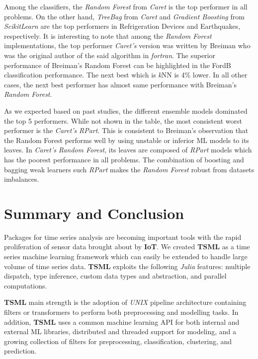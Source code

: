 \documentclass{juliacon}
\begin{document}
\vskip 6pt

Among the classifiers, the \emph{Random Forest} from \emph{Caret} is the top performer in all problems. On the other hand, \emph{TreeBag} from \emph{Caret} and \emph{Gradient Boosting} from \emph{ScikitLearn} are the top performers in Refrigeration Devices and Earthquakes, respectively. It is interesting to note that among the \emph{Random Forest} implementations, the top performer \emph{Caret's} version was written by Breiman\cite{Breiman2001} who was the original author of the said algorithm in \emph{fortran}. The superior performance of Breiman's Random Forest can be highlighted in the FordB classification performance. The next best which is \emph{k}NN is 4\% lower. In all other cases, the next best performer has almost same performance with  Breiman's \emph{Random Forest}.
 
\vskip 6pt
 
As we expected based on past studies, the different ensemble models dominated the top 5 performers. While not shown in the table, the most consistent worst performer is the \emph{Caret's} \emph{RPart}. This is consistent to Breiman's observation that the Random Forest performs well by using unstable or inferior ML models to its leaves. In \emph{Caret's} \emph{Random Forest}, its leaves are composed of \emph{RPart} models which has the poorest performance in all problems. The combination of boosting and bagging weak learners such \emph{RPart} makes the \emph{Random Forest} robust from datasets imbalances.
 
\section{Summary and Conclusion}
Packages for time series analysis are becoming important tools with the rapid proliferation of sensor data brought about by \textbf{IoT}.  We created \textbf{TSML} as a time series machine learning framework which can easily be extended to handle large volume of time series data. 
\textbf{TSML}  exploits the following \emph{Julia} features: multiple dispatch, type inference, custom data types and abstraction, and parallel computations. 

\vskip 6pt

\textbf{TSML} main strength is the adoption of \emph{UNIX} pipeline architecture containing filters or transformers to perform both preprocessing and modelling tasks.  In addition, \textbf{TSML} uses a common machine learning API for both internal and external ML libraries, distributed and threaded support for modeling, and a growing collection of filters for preprocessing, classification, clustering, and prediction. 
\end{document}

